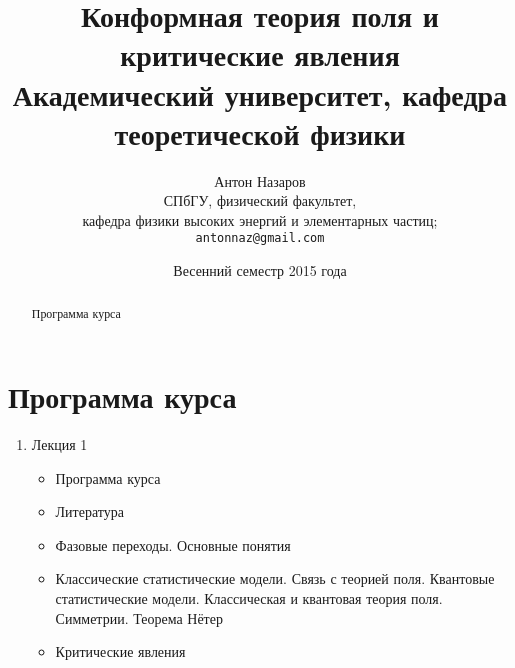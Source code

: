 \documentclass[a4paper,12pt]{article}
\title{Конформная теория поля и критические явления\\
\small{Академический университет, кафедра теоретической физики}
}
\author{Антон Назаров\\
  \small{СПбГУ, физический факультет,}\\
  \small{ кафедра физики высоких энергий и элементарных частиц;}\\
  \texttt{antonnaz@gmail.com}
}
\date{Весенний семестр 2015 года}
\theoremstyle{definition}
\theoremstyle{definition}
\theoremstyle{definition}
\begin{document}
\maketitle
\thispagestyle{empty}
\begin{abstract}
Программа курса
\end{abstract}
\tableofcontents

\section{Программа курса}
\label{sec:program}

\begin{enumerate}
\item Лекция 1
  \begin{itemize}
  \item Программа курса
  \item Литература
  \item Фазовые переходы. Основные понятия
  \item Классические статистические модели. Связь с теорией поля. Квантовые статистические модели.
    Классическая и квантовая теория поля. Симметрии. Теорема Нётер
  \item Критические явления
  \end{itemize}


\end{enumerate}
\end{document}
